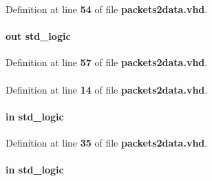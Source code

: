 Definition at line {\bf 54} of file {\bf packets2data.\+vhd}.

\paragraph[{smpl\+\_\+buff\+\_\+valid}]{ {\bfseries \textcolor{keywordflow}{out}\textcolor{vhdlchar}{ }} {\bfseries \textcolor{comment}{std\+\_\+logic}\textcolor{vhdlchar}{ }} \hspace{0.3cm}{\ttfamily [Port]}}\label{classpackets2data_abe43e25dc4e10bbccf64c9dc8306f967}


Definition at line {\bf 57} of file {\bf packets2data.\+vhd}.

\paragraph[{std\+\_\+logic\+\_\+1164}]{\hspace{0.3cm}{\ttfamily [Package]}}\label{classpackets2data_acd03516902501cd1c7296a98e22c6fcb}


Definition at line {\bf 14} of file {\bf packets2data.\+vhd}.

\paragraph[{trxiqpulse}]{ {\bfseries \textcolor{keywordflow}{in}\textcolor{vhdlchar}{ }} {\bfseries \textcolor{comment}{std\+\_\+logic}\textcolor{vhdlchar}{ }} \hspace{0.3cm}{\ttfamily [Port]}}\label{classpackets2data_a808d6d382f3c6a02784a160f67d0f891}


Definition at line {\bf 35} of file {\bf packets2data.\+vhd}.

\paragraph[{wclk}]{ {\bfseries \textcolor{keywordflow}{in}\textcolor{vhdlchar}{ }} {\bfseries \textcolor{comment}{std\+\_\+logic}\textcolor{vhdlchar}{ }} \hspace{0.3cm}{\ttfamily [Port]}}\label{classpackets2data_adc5d3b386b1979488fb85997e33fbd78}


